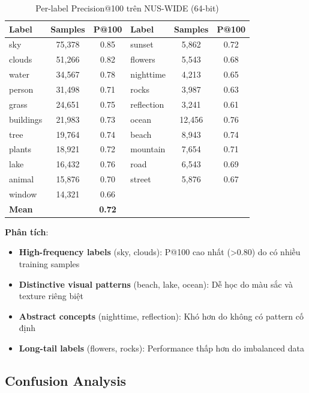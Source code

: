 \documentclass[12pt,a4paper]{article}
\begin{document}
\begin{table}[H]
\centering
\caption{Per-label Precision@100 trên NUS-WIDE (64-bit)}
\label{tab:per_label}
\begin{tabular}{lcc|lcc}
\toprule
\textbf{Label} & \textbf{Samples} & \textbf{P@100} & \textbf{Label} & \textbf{Samples} & \textbf{P@100} \\
\midrule
sky & 75,378 & 0.85 & sunset & 5,862 & 0.72 \\
clouds & 51,266 & 0.82 & flowers & 5,543 & 0.68 \\
water & 34,567 & 0.78 & nighttime & 4,213 & 0.65 \\
person & 31,498 & 0.71 & rocks & 3,987 & 0.63 \\
grass & 24,651 & 0.75 & reflection & 3,241 & 0.61 \\
buildings & 21,983 & 0.73 & ocean & 12,456 & 0.76 \\
tree & 19,764 & 0.74 & beach & 8,943 & 0.74 \\
plants & 18,921 & 0.72 & mountain & 7,654 & 0.71 \\
lake & 16,432 & 0.76 & road & 6,543 & 0.69 \\
animal & 15,876 & 0.70 & street & 5,876 & 0.67 \\
window & 14,321 & 0.66 & & & \\
\midrule
\multicolumn{2}{l}{\textbf{Mean}} & \textbf{0.72} & & & \\
\bottomrule
\end{tabular}
\end{table}

\textbf{Phân tích}:
\begin{itemize}
    \item \textbf{High-frequency labels} (sky, clouds): P@100 cao nhất (>0.80) do có nhiều training samples
    \item \textbf{Distinctive visual patterns} (beach, lake, ocean): Dễ học do màu sắc và texture riêng biệt
    \item \textbf{Abstract concepts} (nighttime, reflection): Khó hơn do không có pattern cố định
    \item \textbf{Long-tail labels} (flowers, rocks): Performance thấp hơn do imbalanced data
\end{itemize}

\subsection{Confusion Analysis}
\end{document}

